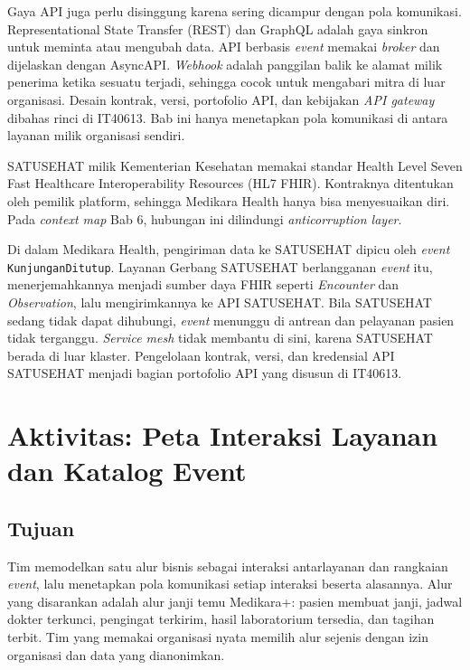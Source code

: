 Gaya API juga perlu disinggung karena sering dicampur dengan pola komunikasi. Representational
State Transfer (REST) dan GraphQL adalah gaya sinkron untuk meminta atau mengubah data. API berbasis
\textit{event} memakai \textit{broker} dan dijelaskan dengan AsyncAPI. \textit{Webhook} adalah
panggilan balik ke alamat milik penerima ketika sesuatu terjadi, sehingga cocok untuk mengabari mitra
di luar organisasi. Desain kontrak, versi, portofolio API, dan kebijakan \textit{API gateway}
dibahas rinci di IT40613. Bab ini hanya menetapkan pola komunikasi di antara layanan milik
organisasi sendiri.

\begin{kasus}[title={Kasus Medikara Health: Integrasi SATUSEHAT sebagai Antarmuka Eksternal}]
  SATUSEHAT milik Kementerian Kesehatan memakai standar Health Level Seven Fast Healthcare
  Interoperability Resources (HL7 FHIR). Kontraknya ditentukan oleh pemilik platform, sehingga
  Medikara Health hanya bisa menyesuaikan diri. Pada \textit{context map} Bab 6, hubungan ini
  dilindungi \textit{anticorruption layer}.

  Di dalam Medikara Health, pengiriman data ke SATUSEHAT dipicu oleh \textit{event}
  \texttt{KunjunganDitutup}. Layanan Gerbang SATUSEHAT berlangganan \textit{event} itu,
  menerjemahkannya menjadi sumber daya FHIR seperti \textit{Encounter} dan \textit{Observation},
  lalu mengirimkannya ke API SATUSEHAT. Bila SATUSEHAT sedang tidak dapat dihubungi,
  \textit{event} menunggu di antrean dan pelayanan pasien tidak terganggu. \textit{Service mesh}
  tidak membantu di sini, karena SATUSEHAT berada di luar klaster. Pengelolaan kontrak, versi, dan
  kredensial API SATUSEHAT menjadi bagian portofolio API yang disusun di IT40613.
\end{kasus}

\section{Aktivitas: Peta Interaksi Layanan dan Katalog Event}
\label{sec:ch09-aktivitas}

\subsection*{Tujuan}

Tim memodelkan satu alur bisnis sebagai interaksi antarlayanan dan rangkaian \textit{event}, lalu
menetapkan pola komunikasi setiap interaksi beserta alasannya. Alur yang disarankan adalah alur
janji temu Medikara+: pasien membuat janji, jadwal dokter terkunci, pengingat terkirim, hasil
laboratorium tersedia, dan tagihan terbit. Tim yang memakai organisasi nyata memilih alur sejenis
dengan izin organisasi dan data yang dianonimkan.


